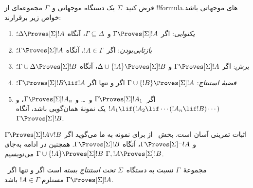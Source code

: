 \documentclass[../../../include/open-logic-section]{subfiles}
\begin{document}


\begin{prop}
  فرض کنید~$\Sigma$ یک دستگاه موجهاتی و~$\Gamma$ مجموعه‌ای از
  !!{formula}های موجهاتی باشد. خواص زیر برقرارند:
  \begin{enumerate}
  \item{} \emph{یکنوایی}: اگر
    $\Gamma \Proves[\Sigma] !A$ و~$\Gamma \subseteq \Delta$، آنگاه
    $\Delta \Proves[\Sigma] !A$؛
  \item{}
    \emph{بازتابی‌بودن}: اگر~$!A \in \Gamma$، آنگاه
    $\Gamma \Proves[\Sigma] !A$؛
  \item{} \emph{برش}: اگر
    $\Gamma \Proves[\Sigma] !A$ و
    $\Delta \cup \{!A\} \Proves[\Sigma] !B$، آنگاه
    $\Gamma \cup \Delta \Proves[\Sigma] !B$؛
  \item{} \emph{قضیهٔ استنتاج}:
    $\Gamma \cup \{!B\} \Proves[\Sigma] !A$ اگر و تنها اگر
    $\Gamma \Proves[\Sigma] !B \lif !A$؛
  \item {}%
    اگر~$\Gamma \Proves[\Sigma] !A_1$ و~\dots{} و
    $\Gamma \Proves[\Sigma] !A_n$، و
    $!A_1 \lif (!A_2 \lif \cdots (!A_n \lif !B)\cdots)$ یک نمونهٔ
    همان‌گویی باشد، آنگاه~$\Gamma \Proves[\Sigma] !B$.
  \end{enumerate}
\end{prop}

اثبات تمرینی آسان است. بخش~ از
 برای نمونه به ما می‌گوید اگر
$\Gamma \Proves[\Sigma] !A \lor !B$ و
$\Gamma \Proves[\Sigma] \lnot !A$، آنگاه
$\Gamma \Proves[\Sigma] !B$. همچنین در ادامه به‌جای
$\Gamma \cup \{ !A\} \Proves[\Sigma] !B$ می‌نویسیم
$\Gamma, !A \Proves[\Sigma] !B$.

\begin{defn}
  مجموعهٔ~$\Gamma$ نسبت به دستگاه~$\Sigma$ \emph{تحت استنتاج بسته} است
  اگر و تنها اگر~$\Gamma \Proves[\Sigma] !A$ مستلزم
  $!A \in \Gamma$ باشد.
\end{defn}
\end{document}
